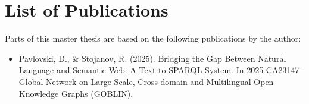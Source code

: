 \section*{List of Publications}

Parts of this master thesis are based on the following publications by the author:

\begin{itemize}
    \item Pavlovski, D., \&  Stojanov, R. (2025). Bridging the Gap Between Natural Language and Semantic Web: A Text-to-SPARQL System. In 2025 CA23147 - Global Network on Large-Scale, Cross-domain and Multilingual Open Knowledge Graphs (GOBLIN). 
\end{itemize}